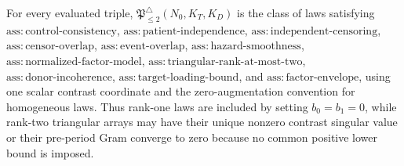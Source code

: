 For every evaluated triple, \(\mathfrak P_{\le2}^{\triangle}(N_0,K_T,K_D)\) is the class of laws satisfying \(\mathrm{ass:control\mbox{-}consistency}\), \(\mathrm{ass:patient\mbox{-}independence}\), \(\mathrm{ass:independent\mbox{-}censoring}\), \(\mathrm{ass:censor\mbox{-}overlap}\), \(\mathrm{ass:event\mbox{-}overlap}\), \(\mathrm{ass:hazard\mbox{-}smoothness}\), \(\mathrm{ass:normalized\mbox{-}factor\mbox{-}model}\), \(\mathrm{ass:triangular\mbox{-}rank\mbox{-}at\mbox{-}most\mbox{-}two}\), \(\mathrm{ass:donor\mbox{-}incoherence}\), \(\mathrm{ass:target\mbox{-}loading\mbox{-}bound}\), and \(\mathrm{ass:factor\mbox{-}envelope}\), using one scalar contrast coordinate and the zero-augmentation convention for homogeneous laws.  Thus rank-one laws are included by setting \(b_0=b_1=0\), while rank-two triangular arrays may have their unique nonzero contrast singular value or their pre-period Gram converge to zero because no common positive lower bound is imposed.
